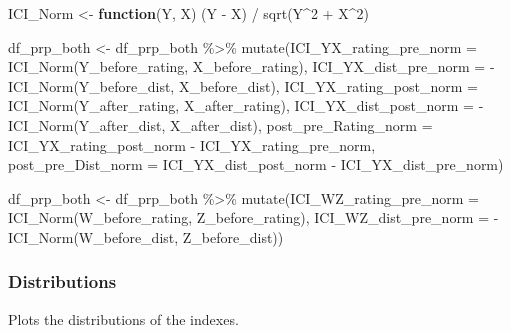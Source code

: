 \documentclass[
  letterpaper,
  DIV=11,
  numbers=noendperiod]{scrartcl}
\newenvironment{Shaded}{\begin{snugshade}}{\end{snugshade}}
\newcommand{\AttributeTok}[1]{\textcolor[rgb]{0.40,0.45,0.13}{#1}}
\newcommand{\ControlFlowTok}[1]{\textcolor[rgb]{0.00,0.23,0.31}{\textbf{#1}}}
\newcommand{\DecValTok}[1]{\textcolor[rgb]{0.68,0.00,0.00}{#1}}
\newcommand{\FunctionTok}[1]{\textcolor[rgb]{0.28,0.35,0.67}{#1}}
\newcommand{\NormalTok}[1]{\textcolor[rgb]{0.00,0.23,0.31}{#1}}
\newcommand{\OtherTok}[1]{\textcolor[rgb]{0.00,0.23,0.31}{#1}}
\newcommand{\SpecialCharTok}[1]{\textcolor[rgb]{0.37,0.37,0.37}{#1}}
\begin{document}
\begin{Shaded}
\begin{Highlighting}[]
\NormalTok{ICI\_Norm }\OtherTok{\textless{}{-}} \ControlFlowTok{function}\NormalTok{(Y, X) (Y }\SpecialCharTok{{-}}\NormalTok{ X) }\SpecialCharTok{/} \FunctionTok{sqrt}\NormalTok{(Y}\SpecialCharTok{\^{}}\DecValTok{2} \SpecialCharTok{+}\NormalTok{ X}\SpecialCharTok{\^{}}\DecValTok{2}\NormalTok{)}

\NormalTok{df\_prp\_both }\OtherTok{\textless{}{-}}\NormalTok{ df\_prp\_both }\SpecialCharTok{\%\textgreater{}\%}
  \FunctionTok{mutate}\NormalTok{(}\AttributeTok{ICI\_YX\_rating\_pre\_norm =} \FunctionTok{ICI\_Norm}\NormalTok{(Y\_before\_rating, X\_before\_rating),}
         \AttributeTok{ICI\_YX\_dist\_pre\_norm =} \SpecialCharTok{{-}} \FunctionTok{ICI\_Norm}\NormalTok{(Y\_before\_dist, X\_before\_dist),}
         \AttributeTok{ICI\_YX\_rating\_post\_norm =} \FunctionTok{ICI\_Norm}\NormalTok{(Y\_after\_rating, X\_after\_rating),}
         \AttributeTok{ICI\_YX\_dist\_post\_norm =} \SpecialCharTok{{-}} \FunctionTok{ICI\_Norm}\NormalTok{(Y\_after\_dist, X\_after\_dist),}
         \AttributeTok{post\_pre\_Rating\_norm =}\NormalTok{ ICI\_YX\_rating\_post\_norm }\SpecialCharTok{{-}}\NormalTok{ ICI\_YX\_rating\_pre\_norm,}
         \AttributeTok{post\_pre\_Dist\_norm =}\NormalTok{ ICI\_YX\_dist\_post\_norm }\SpecialCharTok{{-}}\NormalTok{ ICI\_YX\_dist\_pre\_norm)}

\NormalTok{df\_prp\_both }\OtherTok{\textless{}{-}}\NormalTok{ df\_prp\_both }\SpecialCharTok{\%\textgreater{}\%}
  \FunctionTok{mutate}\NormalTok{(}\AttributeTok{ICI\_WZ\_rating\_pre\_norm =} \FunctionTok{ICI\_Norm}\NormalTok{(W\_before\_rating, Z\_before\_rating),}
         \AttributeTok{ICI\_WZ\_dist\_pre\_norm =} \SpecialCharTok{{-}} \FunctionTok{ICI\_Norm}\NormalTok{(W\_before\_dist, Z\_before\_dist))}
\end{Highlighting}
\end{Shaded}

\subsubsection{Distributions}\label{distributions}

Plots the distributions of the indexes.
\end{document}
